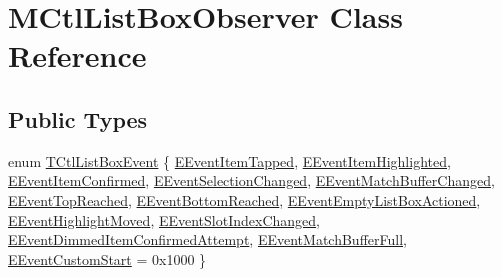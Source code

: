 \hypertarget{classMCtlListBoxObserver}{}\section{M\+Ctl\+List\+Box\+Observer Class Reference}
\label{classMCtlListBoxObserver}
\subsection*{Public Types}
\begin{DoxyCompactItemize}
\item 
enum \hyperlink{classMCtlListBoxObserver_ab9551a8e542c692650a2d4254418597f}{T\+Ctl\+List\+Box\+Event} \{ \newline
\hyperlink{classMCtlListBoxObserver_ab9551a8e542c692650a2d4254418597fa4ba478a28f09b91b393e893ac08139c1}{E\+Event\+Item\+Tapped}, 
\hyperlink{classMCtlListBoxObserver_ab9551a8e542c692650a2d4254418597fabc92b03e912556c47089bd5e91735863}{E\+Event\+Item\+Highlighted}, 
\hyperlink{classMCtlListBoxObserver_ab9551a8e542c692650a2d4254418597fab6706ed10da78be090cf70af8d680ffc}{E\+Event\+Item\+Confirmed}, 
\hyperlink{classMCtlListBoxObserver_ab9551a8e542c692650a2d4254418597fa95724c42e1f845e1c36dfcb3d0ec9f37}{E\+Event\+Selection\+Changed}, 
\newline
\hyperlink{classMCtlListBoxObserver_ab9551a8e542c692650a2d4254418597fa8421c10105c6b882cb17a1f3166f834f}{E\+Event\+Match\+Buffer\+Changed}, 
\hyperlink{classMCtlListBoxObserver_ab9551a8e542c692650a2d4254418597faa21a7a3c75c3659a36b89307e291a03a}{E\+Event\+Top\+Reached}, 
\hyperlink{classMCtlListBoxObserver_ab9551a8e542c692650a2d4254418597fa43824f6c25215002bdef837408b5bc73}{E\+Event\+Bottom\+Reached}, 
\hyperlink{classMCtlListBoxObserver_ab9551a8e542c692650a2d4254418597fa035e3f0c21ddc1616b3761ef1f3f5ac7}{E\+Event\+Empty\+List\+Box\+Actioned}, 
\newline
\hyperlink{classMCtlListBoxObserver_ab9551a8e542c692650a2d4254418597fa0b2b5240900e68d90e4fa1b12cb3e3bf}{E\+Event\+Highlight\+Moved}, 
\hyperlink{classMCtlListBoxObserver_ab9551a8e542c692650a2d4254418597faf2bb42155bddf80e5a39b304fe326498}{E\+Event\+Slot\+Index\+Changed}, 
\hyperlink{classMCtlListBoxObserver_ab9551a8e542c692650a2d4254418597faee24f3770660c68409bd84bfa6697045}{E\+Event\+Dimmed\+Item\+Confirmed\+Attempt}, 
\hyperlink{classMCtlListBoxObserver_ab9551a8e542c692650a2d4254418597fa1355ee232ee0fd81b51542c9623d2635}{E\+Event\+Match\+Buffer\+Full}, 
\newline
\hyperlink{classMCtlListBoxObserver_ab9551a8e542c692650a2d4254418597fadf0d22a23099fd63cf17bbe65ea663db}{E\+Event\+Custom\+Start} = 0x1000
 \}
\end{DoxyCompactItemize}
